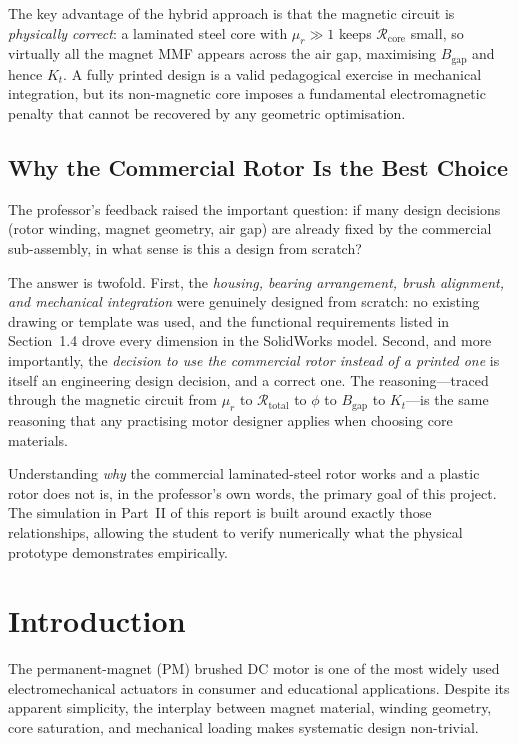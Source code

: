 \documentclass[10pt, twocolumn, a4paper]{article}
\begin{document}
The key advantage of the hybrid approach is that the magnetic circuit is
\emph{physically correct}: a laminated steel core with $\mu_r \gg 1$ keeps
$\mathcal{R}_\text{core}$ small, so virtually all the magnet MMF appears
across the air gap, maximising $B_\text{gap}$ and hence $K_t$.  A fully
printed design is a valid pedagogical exercise in mechanical integration,
but its non-magnetic core imposes a fundamental electromagnetic penalty that
cannot be recovered by any geometric optimisation.

\subsection{Why the Commercial Rotor Is the Best Choice}
\label{subsec:why_commercial}

The professor's feedback raised the important question: if many design
decisions (rotor winding, magnet geometry, air gap) are already fixed by the
commercial sub-assembly, in what sense is this a design from scratch?

The answer is twofold.  First, the \emph{housing, bearing arrangement,
brush alignment, and mechanical integration} were genuinely designed from
scratch: no existing drawing or template was used, and the functional
requirements listed in Section~1.4 drove every dimension in the SolidWorks
model.  Second, and more importantly, the \emph{decision to use the
commercial rotor instead of a printed one} is itself an engineering design
decision, and a correct one.  The reasoning---traced through the magnetic
circuit from $\mu_r$ to $\mathcal{R}_\text{total}$ to $\phi$ to $B_\text{gap}$
to $K_t$---is the same reasoning that any practising motor designer applies
when choosing core materials.

Understanding \emph{why} the commercial laminated-steel rotor works and a
plastic rotor does not is, in the professor's own words, the primary goal of
this project.  The simulation in Part~II of this report is built around
exactly those relationships, allowing the student to verify numerically what
the physical prototype demonstrates empirically.

\section{Introduction}

The permanent-magnet (PM) brushed DC motor is one of the most widely used
electromechanical actuators in consumer and educational applications.
Despite its apparent simplicity, the interplay between magnet material,
winding geometry, core saturation, and mechanical loading makes systematic
design non-trivial.
\end{document}

